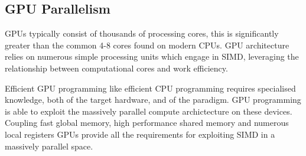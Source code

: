 \subsection{GPU Parallelism}
GPUs typically consist of thousands of processing cores, this is significantly greater than the
common 4-8 cores found on modern CPUs. GPU architecture relies on numerous simple processing units
which engage in SIMD, leveraging the relationship between computational cores and work efficiency.


Efficient GPU programming like efficient CPU programming requires specialised knowledge, both of the
target hardware, and of the paradigm. GPU programming is able to exploit the massively parallel
compute archictecture on these devices. Coupling fast global memory, high performance shared memory
and numerous local registers GPUs provide all the requirements for exploiting SIMD in a massively
parallel space.




